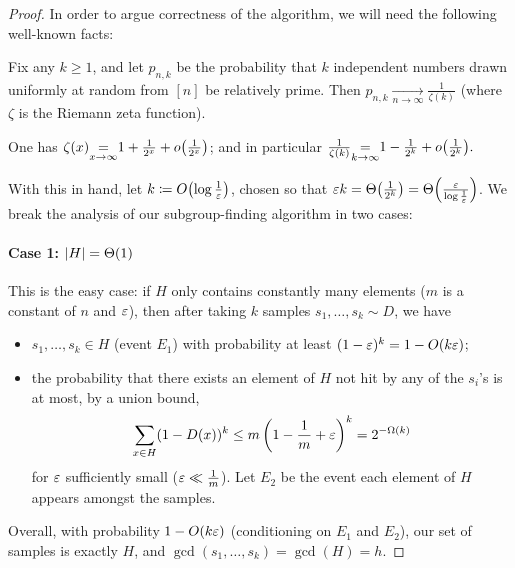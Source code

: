 \begin{proof}
In order to argue correctness of the algorithm, we will need the following well-known facts:

\begin{fact}\label{fact:random:integers:coprime}
Fix any $k\geq 1$, and let $p_{n,k}$ be the probability that $k$ independent numbers drawn uniformly at random from $[n]$ be relatively prime. Then 
$
p_{n,k}\xrightarrow[n\to\infty]{} \frac{1}{\zeta(k)}
$
(where $\zeta$ is the Riemann zeta function).
\end{fact}
\begin{fact} One has
$
\zeta(x) {\displaystyle\operatorname*{=}_{x\to\infty}} 1 + \frac{1}{2^x} + \littleO{\frac{1}{2^x}} 
$;
and in particular
$
\frac{1}{\zeta(k)} {\displaystyle\operatorname*{=}_{k\to\infty}} 1 - \frac{1}{2^k} + \littleO{\frac{1}{2^k}}.
$
\end{fact}

\noindent With this in hand, let $k\eqdef\bigO{\log\frac{1}{\eps}}$,  chosen so that $\eps k = \bigTheta{\frac{1}{2^k}} = \bigTheta{\frac{\eps}{\log\frac{1}{\eps}}}$. We break the analysis of our subgroup-finding algorithm in two cases:
\paragraph{Case 1: $\abs{H}=\bigTheta{1}$} This is the easy case: if $H$ only contains constantly many elements ($m$ is a constant of $n$ and $\varepsilon$), then after taking $k$ samples $s_1,\dots,s_k\sim D$, we have
\begin{itemize}
  \item $s_1,\dots,s_k\in H$ (event $E_1$) with probability at least $(1-\eps)^k = 1 - \bigO{k\eps}$;  \item the probability that there exists an element of $H$ not hit by any of the $s_i$'s is at most, by a union bound,
    \[
       \sum_{x\in H} (1-\D(x))^k \leq m\left(1-\frac{1}{m}+\eps\right)^k = 2^{-\bigOmega{k}}
    \]
    for $\varepsilon$ sufficiently small ($\varepsilon \ll \frac{1}{m}$). Let $E_2$ be the event each element of $H$ appears amongst the samples.
\end{itemize}
Overall, with probability $1 - \bigO{k\eps}$ (conditioning on $E_1$ and $E_2$), our set of samples is exactly $H$, and $\gcd(s_1,\dots,s_k)=\gcd(H)=h$.

\end{proof}
